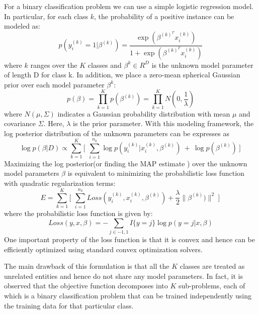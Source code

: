 \documentclass[10pt,twocolumn,letterpaper]{article}
\begin{document}
For a binary classification problem we can use a simple logistic regression model. In particular, 
for each class $k$, the probability of a positive instance can be modeled as: 
\begin{equation}
  p(y_{i}^{(k)} = 1 | \beta^{(k)} )  = \frac { \exp( \beta^{(k)^{T}}  x_{i}^{(k)})  }{  1 + \exp(\beta^{(k)^{T}}  x_{i}^{(k)} ) } 
\end{equation}
where $k$ ranges over the $K$ classes and $ \beta^{k}  \in R^{D} $ is the unknown model parameter of length D 
for class k. 
In addition, we place a zero-mean spherical Gaussian prior over each model parameter  $  \beta^{k} $:
\begin{equation}
  p(\beta)  = \prod_{k=1}^{K} p(\beta^{(k)}) = \prod_{k=1}^{K} N(0, \frac{1}{\lambda})
\end{equation}
where $N(\mu, \Sigma)$ indicates a Gaussian probability distribution with mean $\mu$ and covariance $\Sigma$.
Here, $\lambda$ is the prior parameter.  With this modeling framework, the log posterior distribution of the unknown 
parameters can be expresses as 
\begin{equation}
  \log p(\beta | D) \propto \sum_{k=1}^{K} \Big[ \, \ \sum_{i=1}^{n_{k}} \log p(y_{i}^{(k)} | x_{i}^{(k)}, \beta^{(k)}) \ + \ \log p(\beta^{(k)}) \ \Big] \,
\end{equation}
Maximizing the log posterior(or finding the MAP estimate ) over the unknown model parameters $\beta$  is  equivalent to 
minimizing the probabilistic loss function with quadratic regularization terms:
\begin{equation}
  E = \sum_{k=1}^{K}  \Big[ \, \ \sum_{i=1}^{n_{k}} Loss(y_{i}^{(k)}, x_{i}^{(k)}, \beta^{(k)}) + \frac{\lambda}{2} \| \beta^{(k)}) \|^{2} \ \Big] \,
\end{equation} 
where the probabilistic loss function is given by:
\begin{equation}
  Loss(y,  x,  \beta)  =  - \sum_{j \in {-1,1} } I\{y=j\} \log p(y=j | x,\beta)
\end{equation} 
One important property of the loss function is that it is convex and hence can be efficiently optimized
using standard convex optimization solvers.

The main drawback of this formulation is that all the $K$ classes are treated as unrelated entities and hence 
do not share any model parameters. In fact, it is observed that the objective function decomposes into 
$K$ sub-problems, each of which is a binary classification problem that can be trained independently 
using the training data for that particular class.
\end{document}
